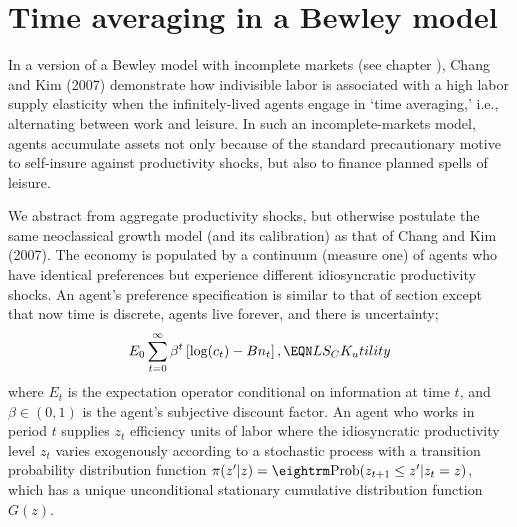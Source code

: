 \section{Time averaging in a Bewley model}\label{sec:ChangKim}%
In a version of a Bewley model with incomplete markets
(see chapter ),
Chang and Kim (2007) demonstrate how indivisible labor is
associated with a high labor supply elasticity when the
infinitely-lived agents engage in `time averaging,' i.e.,
alternating between work and leisure. In such an
incomplete-markets model, agents accumulate assets not only
because of the standard precautionary motive to self-insure
against productivity shocks, but also to finance  planned spells of leisure.
%
%

We abstract from aggregate productivity shocks, but otherwise
postulate the same neoclassical growth model (and its
calibration) as that of Chang and Kim (2007). The economy is
populated by a continuum (measure one) of agents who have
identical preferences but experience different idiosyncratic
productivity shocks. An agent's preference specification is
similar to that of section  except  that
now time is discrete, agents live forever, and there is uncertainty;
$$
E_0 \sum_{t=0}^\infty \beta^t \left[\log (c_t) - B n_t \right],
\EQN LS_CK_utility
$$
where $E_t$ is the expectation operator conditional on information
at time $t$, and $\beta\in(0,1)$ is the agent's subjective discount
factor. An agent who works in period $t$ supplies $z_t$ efficiency
units of labor where the idiosyncratic productivity
level $z_t$ varies exogenously according to a stochastic
process with a transition probability distribution function
$\pi(z ' \vert z) = {\rm Prob}(z_{t+1}\leq z' \vert z_t=z)$,
which has a unique unconditional stationary cumulative
distribution function $G(z)$.

